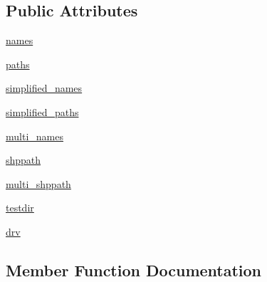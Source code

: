 \subsection*{Public Attributes}
\begin{DoxyCompactItemize}
\item 
\hyperlink{classnetworkx_1_1readwrite_1_1tests_1_1test__shp_1_1TestShp_a343dff602f98589d05534efdfaa8c929}{names}
\item 
\hyperlink{classnetworkx_1_1readwrite_1_1tests_1_1test__shp_1_1TestShp_af33094990aa8514ef965d355b0ce42bb}{paths}
\item 
\hyperlink{classnetworkx_1_1readwrite_1_1tests_1_1test__shp_1_1TestShp_a1c7e3b8899dd718c0d363279885bc89d}{simplified\+\_\+names}
\item 
\hyperlink{classnetworkx_1_1readwrite_1_1tests_1_1test__shp_1_1TestShp_a5eec607ee16f80c836f578d3a357dedc}{simplified\+\_\+paths}
\item 
\hyperlink{classnetworkx_1_1readwrite_1_1tests_1_1test__shp_1_1TestShp_a87de7335699abf26c098f163bf6a514b}{multi\+\_\+names}
\item 
\hyperlink{classnetworkx_1_1readwrite_1_1tests_1_1test__shp_1_1TestShp_ad2ef5cf46ceb2d56ce5472a9617781db}{shppath}
\item 
\hyperlink{classnetworkx_1_1readwrite_1_1tests_1_1test__shp_1_1TestShp_a28741ef2b0ee44e2fdc57792466546bd}{multi\+\_\+shppath}
\item 
\hyperlink{classnetworkx_1_1readwrite_1_1tests_1_1test__shp_1_1TestShp_af57372342a141cb984b5bfc996ad6f79}{testdir}
\item 
\hyperlink{classnetworkx_1_1readwrite_1_1tests_1_1test__shp_1_1TestShp_a93db3b12f425ffe7d2d39c09f84a0883}{drv}
\end{DoxyCompactItemize}


\subsection{Member Function Documentation}
\mbox{\label{classnetworkx_1_1readwrite_1_1tests_1_1test__shp_1_1TestShp_a5ca6241bc161d4aaa1684f8643be1425}} 
